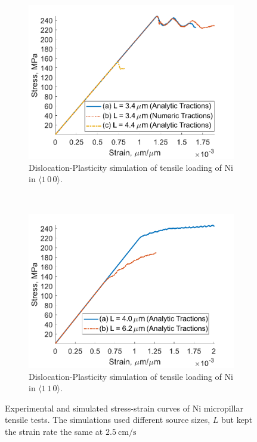 \begin{figure}
    \begin{subfigure}[t]{0.45\linewidth}
        \centering
        \includegraphics[width=\linewidth]{../data/Ni100_DDD.pdf}
        \caption[Dislocation-Plasticity simulation of tensile loading of Ni in $\langle 1\, 0\, 0 \rangle$.]{Dislocation-Plasticity simulation of tensile loading of Ni in $\langle 1\, 0\, 0 \rangle$.}
        \label{sf:Ni100_DDD}
    \end{subfigure}
    ~
    \begin{subfigure}[t]{0.45\linewidth}
        \centering
        \includegraphics[width=\linewidth]{../data/Ni110_DDD.pdf}
        \caption[Dislocation-Plasticity simulation of tensile loading of Ni in $\langle 1\, 1\, 0 \rangle$.]{Dislocation-Plasticity simulation of tensile loading of Ni  in $\langle 1\, 1\, 0 \rangle$.}
        \label{sf:Ni110_DDD}
    \end{subfigure}
    \caption{Experimental and simulated stress-strain curves of Ni micropillar tensile tests. The simulations used different source sizes, $L$ but kept the strain rate the same at $\SI{2.5}{\centi\metre\per\second}$}
    \label{f:NiStrainStress}
\end{figure}

